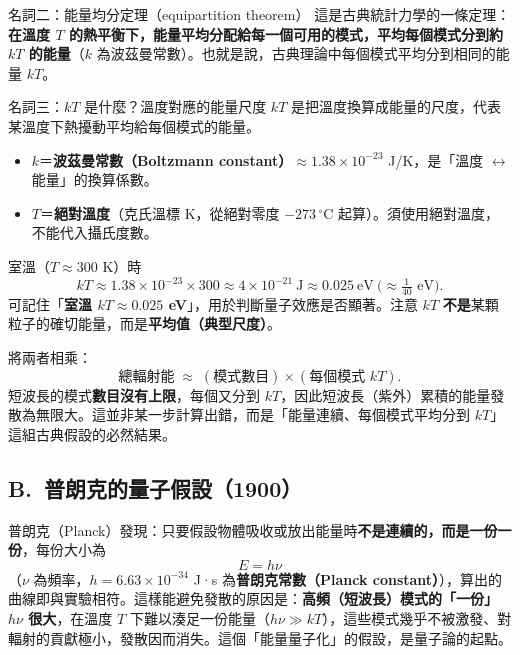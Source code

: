 \documentclass[11pt]{article}
\begin{document}

\begin{補充框}{名詞二：能量均分定理（equipartition theorem）}
這是古典統計力學的一條定理：\textbf{在溫度 $T$ 的熱平衡下，能量平均分配給每一個可用的模式，平均每個模式分到約 $kT$ 的能量}（$k$ 為波茲曼常數）。也就是說，古典理論中每個模式平均分到相同的能量 $kT$。
\end{補充框}

\begin{補充框}{名詞三：$kT$ 是什麼？溫度對應的能量尺度}
$kT$ 是把溫度換算成能量的尺度，代表某溫度下熱擾動平均給每個模式的能量。
\begin{itemize}\setlength{\itemsep}{1pt}
\item $k$＝\textbf{波茲曼常數（Boltzmann constant）}$\approx 1.38\times10^{-23}$ J/K，是「溫度 $\leftrightarrow$ 能量」的換算係數。
\item $T$＝\textbf{絕對溫度}（克氏溫標 K，從絕對零度 $-273\,^\circ$C 起算）。須使用絕對溫度，不能代入攝氏度數。
\end{itemize}
室溫（$T\approx300$ K）時
$$kT \approx 1.38\times10^{-23}\times300 \approx 4\times10^{-21}\ \text{J} \approx 0.025\ \text{eV}\ \Big(\approx\tfrac{1}{40}\text{ eV}\Big).$$
可記住「\textbf{室溫 $kT\approx0.025$ eV}」，用於判斷量子效應是否顯著。注意 $kT$ \textbf{不是}某顆粒子的確切能量，而是\textbf{平均值（典型尺度）}。
\end{補充框}

將兩者相乘：
$$\text{總輻射能} \;\approx\; (\text{模式數目}) \times (\text{每個模式 } kT).$$
短波長的模式\textbf{數目沒有上限}，每個又分到 $kT$，因此短波長（紫外）累積的能量發散為無限大。這並非某一步計算出錯，而是「能量連續、每個模式平均分到 $kT$」這組古典假設的必然結果。


\subsection*{\sffamily B.\ 普朗克的量子假設（1900）}

普朗克（Planck）發現：只要假設物體吸收或放出能量時\textbf{不是連續的，而是一份一份}，每份大小為
$$\boxed{\,E = h\nu\,}$$
（$\nu$ 為頻率，$h=6.63\times10^{-34}$ J·s 為\textbf{普朗克常數（Planck constant）}），算出的曲線即與實驗相符。這樣能避免發散的原因是：\textbf{高頻（短波長）模式的「一份」$h\nu$ 很大}，在溫度 $T$ 下難以湊足一份能量（$h\nu\gg kT$），這些模式幾乎不被激發、對輻射的貢獻極小，發散因而消失。這個「能量量子化」的假設，是量子論的起點。
\end{document}
